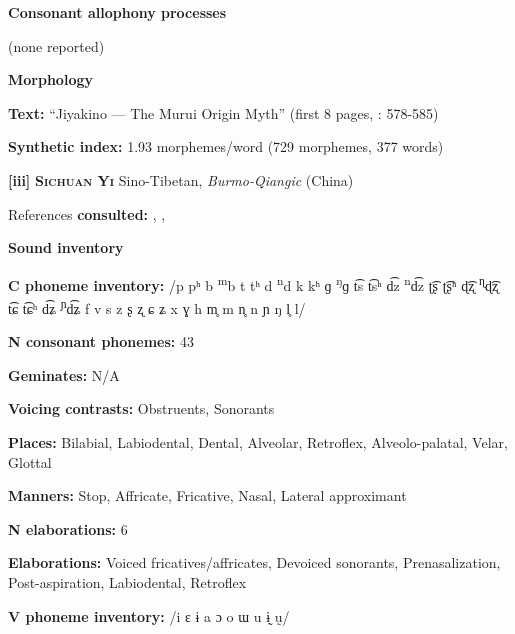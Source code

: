 \textbf{Consonant allophony processes}



(none reported)



\textbf{Morphology}



\textbf{Text:} “Jiyakino — The Murui Origin Myth” (first 8 pages, \citealt{Wojtylak2017}: 578-585)



\textbf{Synthetic index:} 1.93 morphemes/word (729 morphemes, 377 words)



\textbf{[iii]}   \textbf{\textsc{Sichuan Yi}}  Sino-Tibetan, \textit{Burmo-Qiangic} (China)



References \textbf{consulted:} \citet{Gerner2013}, \citet{Maoji1997}, \citet{Merrifield2012}



\textbf{Sound inventory}



\textbf{C phoneme inventory:} /p pʰ b \textsuperscript{m}b t tʰ d \textsuperscript{n}d k kʰ ɡ \textsuperscript{ŋ}ɡ t͡s t͡sʰ d͡z \textsuperscript{n}d͡z ʈ͡ʂ ʈ͡ʂʰ ɖ͡ʐ \textsuperscript{ɳ}ɖ͡ʐ t͡ɕ t͡ɕʰ d͡ʑ \textsuperscript{ɲ}d͡ʑ f v s z ʂ ʐ ɕ ʑ x ɣ h m̥ m n̥ n ɲ ŋ l̥ l/



\textbf{N consonant phonemes:} 43



\textbf{Geminates:} N/A



\textbf{Voicing contrasts:} Obstruents, Sonorants



\textbf{Places:} Bilabial, Labiodental, Dental, Alveolar, Retroflex, Alveolo-palatal, Velar, Glottal



\textbf{Manners:} Stop, Affricate, Fricative, Nasal, Lateral approximant



\textbf{N elaborations:} 6



\textbf{Elaborations:} Voiced fricatives/affricates, Devoiced sonorants, Prenasalization, Post-aspiration, Labiodental, Retroflex



\textbf{V phoneme inventory:} /i ɛ ɨ a ɔ o ɯ u ɨ̰ ṵ/



